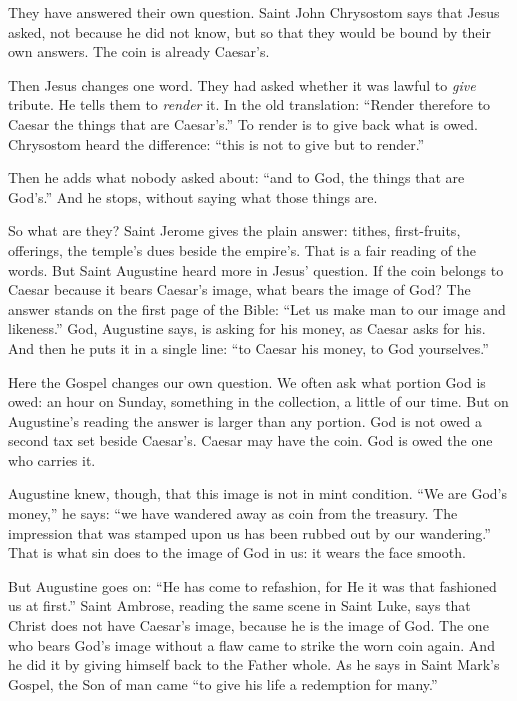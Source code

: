 They have answered their own question. Saint John Chrysostom says that Jesus
asked, not because he did not know, but so that they would be bound by their
own answers. The coin is already Caesar's.

Then Jesus changes one word. They had asked whether it was lawful to
\emph{give} tribute. He tells them to \emph{render} it. In the old
translation: ``Render therefore to Caesar the things that are Caesar's.'' To
render is to give back what is owed. Chrysostom heard the difference: ``this
is not to give but to render.''

Then he adds what nobody asked about: ``and to God, the things that are
God's.'' And he stops, without saying what those things are.

\bigskip

So what are they? Saint Jerome gives the plain answer: tithes, first-fruits,
offerings, the temple's dues beside the empire's. That is a fair reading of
the words. But Saint Augustine heard more in Jesus' question. If the coin
belongs to Caesar because it bears Caesar's image, what bears the image of
God? The answer stands on the first page of the Bible: ``Let us make man to
our image and likeness.'' God, Augustine says, is asking for his money, as
Caesar asks for his. And then he puts it in a single line: ``to Caesar his
money, to God yourselves.''

Here the Gospel changes our own question. We often ask what portion God is
owed: an hour on Sunday, something in the collection, a little of our time.
But on Augustine's reading the answer is larger than any portion. God is not
owed a second tax set beside Caesar's. Caesar may have the coin. God is owed
the one who carries it.

\bigskip

Augustine knew, though, that this image is not in mint condition. ``We are
God's money,'' he says: ``we have wandered away as coin from the treasury. The
impression that was stamped upon us has been rubbed out by our wandering.''
That is what sin does to the image of God in us: it wears the face smooth.

But Augustine goes on: ``He has come to refashion, for He it was that
fashioned us at first.'' Saint Ambrose, reading the same scene in Saint Luke,
says that Christ does not have Caesar's image, because he is the image of God.
The one who bears God's image without a flaw came to strike the worn coin
again. And he did it by giving himself back to the Father whole. As he says
in Saint Mark's Gospel, the Son of man came ``to give his life a redemption
for many.''

